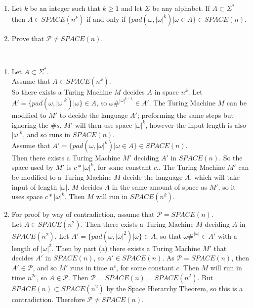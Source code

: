 \documentclass{assignment}
\begin{document}
\begin{problemlist}
\pbitem
\begin{problem}
  \begin{enumerate}
  \item Let $k$ be an integer such that $k \ge 1$ and let $\Sigma$ be any alphabet. If $A \subset \Sigma^*$ then $A \in SPACE(n^k)$ if and only if $\{pad(\omega,|\omega|^k)|\omega \in A\}\in SPACE(n)$.
    \item Prove that $\mathcal{P} \neq SPACE(n).$
  \end{enumerate}
\end{problem}
\begin{answer}
\\
\begin{enumerate}
\item Let $A \subset \Sigma^*$.\\
Assume that $A \in SPACE(n^k)$.\\
So there exists a Turing Machine $M$ decides $A$ in space $n^k$. Let $A' = \{pad(\omega, |\omega|^k)|\omega\} \in A$, so $\omega \#^{|\omega|^{k-1}} \in A'$. The Turing Machine $M$ can be modified to $M'$ to decide the language $A'$; preforming the same steps but ignoring the $\#s$. $M'$ will then use space $|\omega|^k$, however the input length is also $|\omega|^k$, and so runs in $SPACE(n)$.\\
Assume that $A' = \{pad(\omega, |\omega|^k)|\omega \in A\}\in SPACE(n)$.\\
Then there exists a Turing Machine $M'$ deciding $A'$ in $SPACE(n)$. So the space used by $M'$ is $c * |\omega|^k$, for some constant $c$.. The Turing Machine $M'$ can be modified to a Turing Machine $M$ decide the language $A$, which will take input of length $|\omega|$. $M$ decides $A$ in the same amount of space as $M'$, so it uses space $c * |\omega|^k$. Then $M$ will run in $SPACE(n^k)$.
\item For proof by way of contradiction, assume that $\mathcal{P} = SPACE(n)$.\\
Let $A \in SPACE(n^2)$. Then there exists a Turing Machine $M$ deciding $A$ in $SPACE(n^2)$. Let $A' = \{pad(\omega, |\omega|^2)|\omega\} \in A$, so that $\omega \#^{|\omega|} \in A'$ with a length of $|\omega|^2$. Then by part (a) there exists a Turing Machine $M'$ that decides $A'$ in $SPACE(n)$, so $A'\in SPACE(n)$. As $\mathcal{P} = SPACE(n)$, then $A'\in \mathcal{P}$, and so $M'$ runs in time $n^c$, for some constant $c$. Then $M$ will run in time $n^{2c}$, so $A\in \mathcal{P}$. Then $\mathcal{P} =  SPACE(n) = SPACE(n^2)$. But $SPACE(n) \subset SPACE(n^2)$ by the Space Hierarchy Theorem, so this is a contradiction. Therefore $\mathcal{P} \neq SPACE(n)$.

\end{enumerate}
\end{answer}
\end{problemlist}
\end{document}
